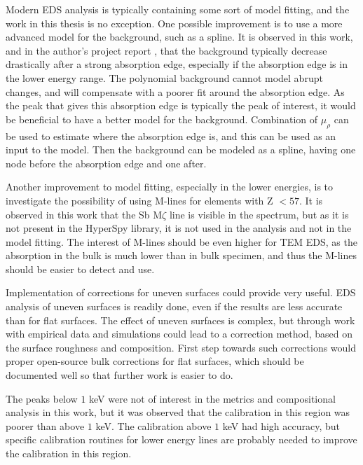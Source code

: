 Modern EDS analysis is typically containing some sort of model fitting, and the work in this thesis is no exception.
One possible improvement is to use a more advanced model for the background, such as a spline.
It is observed in this work, and in the author's project report \cite{project_report}, that the background typically decrease drastically after a strong absorption edge, especially if the absorption edge is in the lower energy range.
The polynomial background cannot model abrupt changes, and will compensate with a poorer fit around the absorption edge.
As the peak that gives this absorption edge is typically the peak of interest, it would be beneficial to have a better model for the background.
Combination of $\mu_\rho$ can be used to estimate where the absorption edge is, and this can be used as an input to the model.
Then the background can be modeled as a spline, having one node before the absorption edge and one after.

Another improvement to model fitting, especially in the lower energies, is to investigate the possibility of using M-lines for elements with Z $ < 57$.
It is observed in this work that the Sb M$\zeta$ line is visible in the spectrum, but as it is not present in the HyperSpy library, it is not used in the analysis and not in the model fitting.
The interest of M-lines should be even higher for TEM EDS, as the absorption in the bulk is much lower than in bulk specimen, and thus the M-lines should be easier to detect and use.

Implementation of corrections for uneven surfaces could provide very useful.
EDS analysis of uneven surfaces is readily done, even if the results are less accurate than for flat surfaces.
The effect of uneven surfaces is complex, but through work with empirical data and simulations could lead to a correction method, based on the surface roughness and composition.
First step towards such corrections would proper open-source bulk corrections for flat surfaces, which should be documented well so that further work is easier to do.

The peaks below $1$ keV were not of interest in the metrics and compositional analysis in this work, but it was observed that the calibration in this region was poorer than above $1$ keV.
The calibration above $1$ keV had high accuracy, but specific calibration routines for lower energy lines are probably needed to improve the calibration in this region.

